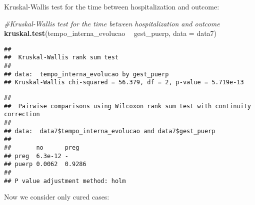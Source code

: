 \documentclass[
]{article}
\newenvironment{Shaded}{\begin{snugshade}}{\end{snugshade}}
\newcommand{\CommentTok}[1]{\textcolor[rgb]{0.56,0.35,0.01}{\textit{#1}}}
\newcommand{\DataTypeTok}[1]{\textcolor[rgb]{0.13,0.29,0.53}{#1}}
\newcommand{\KeywordTok}[1]{\textcolor[rgb]{0.13,0.29,0.53}{\textbf{#1}}}
\newcommand{\NormalTok}[1]{#1}
\newcommand{\OperatorTok}[1]{\textcolor[rgb]{0.81,0.36,0.00}{\textbf{#1}}}
\newcommand{\StringTok}[1]{\textcolor[rgb]{0.31,0.60,0.02}{#1}}
\begin{document}
Kruskal-Wallis test for the time between hospitalization and outcome:

\begin{Shaded}
\begin{Highlighting}[]
\CommentTok{#Kruskal-Wallis test for the time between hospitalization and outcome}
\KeywordTok{kruskal.test}\NormalTok{(tempo_interna_evolucao }\OperatorTok{~}\StringTok{ }\NormalTok{gest_puerp,}
             \DataTypeTok{data =}\NormalTok{ data7)}
\end{Highlighting}
\end{Shaded}

\begin{verbatim}
## 
##  Kruskal-Wallis rank sum test
## 
## data:  tempo_interna_evolucao by gest_puerp
## Kruskal-Wallis chi-squared = 56.379, df = 2, p-value = 5.719e-13
\end{verbatim}

\begin{Shaded}
\end{Shaded}

\begin{verbatim}
## 
##  Pairwise comparisons using Wilcoxon rank sum test with continuity correction 
## 
## data:  data7$tempo_interna_evolucao and data7$gest_puerp 
## 
##       no      preg  
## preg  6.3e-12 -     
## puerp 0.0062  0.9286
## 
## P value adjustment method: holm
\end{verbatim}

Now we consider only cured cases:

\begin{Shaded}
\end{Shaded}
\end{document}
